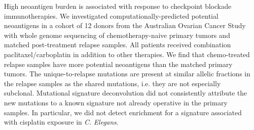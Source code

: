 High neoantigen burden is associated with response to checkpoint blockade immunotherapies. We investigated computationally-predicted potential neoantigens in a cohort of 12 donors from the Australian Ovarian Cancer Study with whole genome sequencing of chemotherapy-naive primary tumors and matched post-treatment relapse samples. All patients received combination paclitaxel/carboplatin in addition to other therapies. We find that chemo-treated relapse samples have more potential neoantigens than the matched primary tumors. The unique-to-relapse mutations are present at similar allelic fractions in the relapse samples as the shared mutations, i.e. they are not especially subclonal. Mutational signature deconvolution did not consistently attribute the new mutations to a known signature not already operative in the primary samples. In particular, we did not detect enrichment for a signature associated with cisplatin exposure in \textit{C. Elegans}.

